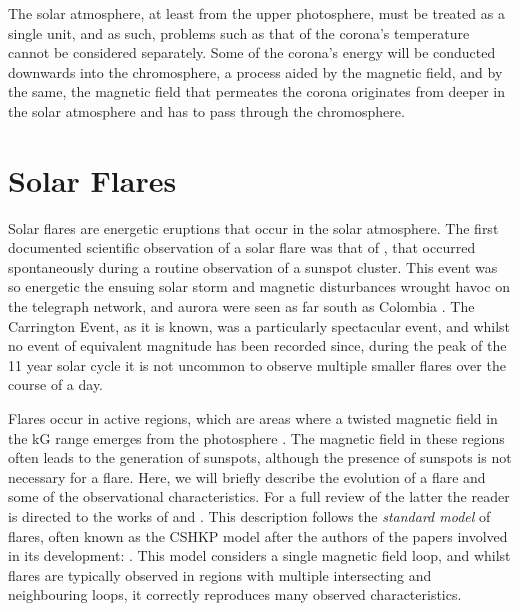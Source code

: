 The solar atmosphere, at least from the upper photosphere, must be treated as a single unit, and as such, problems such as that of the corona's temperature cannot be considered separately.
Some of the corona's energy will be conducted downwards into the chromosphere, a process aided by the magnetic field, and by the same, the magnetic field that permeates the corona originates from deeper in the solar atmosphere and has to pass through the chromosphere.

\section{Solar Flares}

Solar flares are energetic eruptions that occur in the solar atmosphere.
The first documented scientific observation of a solar flare was that of \citet{Carrington1859}, that occurred spontaneously during a routine observation of a sunspot cluster.
This event was so energetic the ensuing solar storm and magnetic disturbances wrought havoc on the telegraph network, and aurora were seen as far south as Colombia \citep{MorenoCardenas2016}.
The Carrington Event, as it is known, was a particularly spectacular event, and whilst no event of equivalent magnitude has been recorded since, during the peak of the 11 year solar cycle it is not uncommon to observe multiple smaller flares over the course of a day.

Flares occur in active regions, which are areas where a twisted magnetic field in the kG range emerges from the photosphere \citep[For a review of active region evolution see][]{VanDriel-Gesztelyi2015}.
The magnetic field in these regions often leads to the generation of sunspots, although the presence of sunspots is not necessary for a flare.
Here, we will briefly describe the evolution of a flare and some of the observational characteristics.
For a full review of the latter the reader is directed to the works of \citet{Benz2008} and \citet{Fletcher2011}.
This description follows the \emph{standard model} of flares, often known as the CSHKP model after the authors of the papers involved in its development: \citet{Carmichael1964,Sturrock1966,Hirayama1974,Kopp1976}.
This model considers a single magnetic field loop, and whilst flares are typically observed in regions with multiple intersecting and neighbouring loops, it correctly reproduces many observed characteristics.

